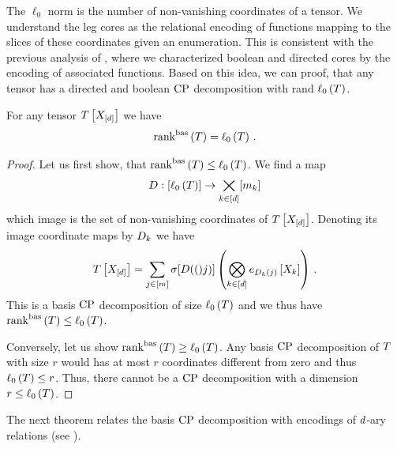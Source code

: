 
The $\ell_0$ norm is the number of non-vanishing coordinates of a tensor.
We understand the leg cores as the relational encoding of functions mapping to the slices of these coordinates given an enumeration.
This is consistent with the previous analysis of , where we characterized boolean and directed cores by the encoding of associated functions.
Based on this idea, we can proof, that any tensor has a directed and boolean $\mathrm{CP}$ decomposition with rand $\ell_0\left(T\right)$.


\begin{theorem}
    \label{the:sparseBasisCP}
    For any tensor $T\left[X_{[d]}\right]$ we have
    \begin{align*}
        \mathrm{rank}^{\mathrm{bas}}\left(T\right) = \ell_0\left(T\right) \, .
    \end{align*}
\end{theorem}
\begin{proof}
    Let us first show, that $\mathrm{rank}^{\mathrm{bas}}\left(T\right) \leq \ell_0\left(T\right)$.
    We find a map
    \begin{align*}
        D : [\ell_0\left(T\right)] \rightarrow  \bigtimes_{k\in[d]}[m_{k}]
    \end{align*}
    which image is the set of non-vanishing coordinates of $T\left[X_{[d]}\right]$.
    Denoting its image coordinate maps by $D_{k}$ we have
    \begin{align*}
        T\left[X_{[d]}\right]
        = \sum_{j\in[m]} \sigma[D(()j)] \left(\bigotimes_{k\in[d]} e_{D_{k}(j)}\left[X_{k}\right] \right) \, .
    \end{align*}
    This is a basis $\mathrm{CP}$ decomposition of size $\ell_0\left(T\right)$ and we thus have $\mathrm{rank}^{\mathrm{bas}}\left(T\right)\leq\ell_0\left(T\right)$.

    Conversely, let us show $\mathrm{rank}^{\mathrm{bas}}\left(T\right) \geq \ell_0\left(T\right)$.
    Any basis $\mathrm{CP}$ decomposition of $T$ with size $r$ would has at most $r$ coordinates different from zero and thus $\ell_0\left(T\right)\leq r$.
    Thus, there cannot be a $\mathrm{CP}$ decomposition with a dimension $r\leq\ell_0\left(T\right)$.
\end{proof}

%
The next theorem relates the basis $\mathrm{CP}$ decomposition with encodings of $d$-ary relations (see ).

